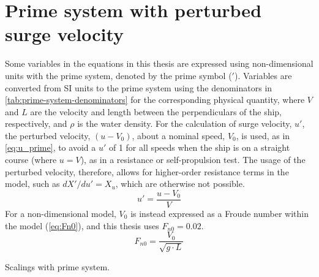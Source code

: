 \section{Prime system with perturbed surge velocity} \label{sec:prime_system}
Some variables in the equations in this thesis are expressed using non-dimensional units with the prime system, denoted by the prime symbol ($'$). Variables are converted from SI units to the prime system using the denominators in \autoref{tab:prime-system-denominators} for the corresponding physical quantity, where $V$ and $L$ are the velocity and length between the perpendiculars of the ship, respectively, and $\rho$ is the water density.
For the calculation of surge velocity, $u'$, the perturbed velocity, $(u-V_0)$, about a nominal speed, $V_0$, is used, as in \autoref{eq:u_prime}, to avoid a $u'$ of 1 for all speeds when the ship is on a straight course (where $u=V$), as in a resistance or self-propulsion test. The usage of the perturbed velocity, therefore, allows for higher-order resistance terms in the model, such as ${{dX}'/du}' = X_{u}$, which are otherwise not possible. 
\begin{equation}
    \label{eq:u_prime}
    u' = \frac{u-V_0}{V}
\end{equation}
For a non-dimensional model, $V_0$ is instead expressed as a Froude number within the model (\autoref{eq:Fn0}), and this thesis uses $F_{n0}=0.02$.
\begin{equation}
    \label{eq:Fn0}
    F_{n0} = \frac{V_0}{\sqrt{g \cdot L}}
\end{equation}
\begin{table}[h]
    \centering
    \caption{Scalings with prime system.}
    \label{tab:prime-system-denominators}
\end{table}